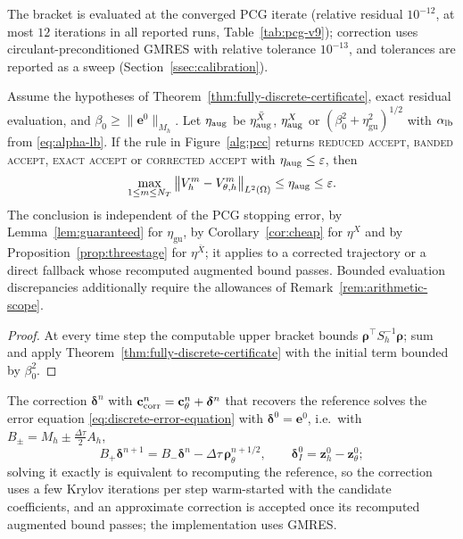 \documentclass[hidelinks]{siamart251216}
\newcommand{\Mh}{M_h}
\newcommand{\Ah}{A_h}
\newcommand{\Sh}{S_h}
\newcommand{\norm}[1]{\left\lVert #1\right\rVert}
\newcommand{\dt}{\Delta\tau}
\newcommand{\etaGuar}{\eta_{\mathrm{gu}}}
\newcommand{\ee}{\mathbf e}
\newcommand{\cc}{\mathbf c}
\newcommand{\rr}{\bm\rho}
\newcommand{\zz}{\mathbf z}
\newcommand{\dd}{\bm\delta}
\begin{document}
The bracket is evaluated at the converged PCG iterate (relative residual $10^{-12}$, at most
$12$ iterations in all reported runs, Table~\ref{tab:pcg-v9}); correction uses circulant-preconditioned
GMRES with relative tolerance $10^{-13}$, and tolerances are reported as a sweep
(Section~\ref{ssec:calibration}).
\begin{proposition}
\label{prop:two-stage}
Assume the hypotheses of Theorem~\ref{thm:fully-discrete-certificate},
exact residual evaluation, and $\beta_0\ge\|\ee^0\|_{\Mh}$. Let $\eta_{\rm aug}$ be
$\eta^{\bar X}_{\rm aug}$, $\eta^X_{\rm aug}$ or $(\beta_0^2+\etaGuar^2)^{1/2}$ with $\alpha_{\rm lb}$ from \eqref{eq:alpha-lb}.
If the rule in Figure~\ref{alg:pcc} returns
\textsc{reduced accept}, \textsc{banded accept}, \textsc{exact accept} or \textsc{corrected accept} with $\eta_{\rm aug}\le\varepsilon$, then
\begin{equation}
  \max_{1\le m\le N_T}\norm{V_h^m-V_{\theta,h}^m}_{L^2(\Omega)}
  \le \eta_{\rm aug}\le\varepsilon .
  \label{eq:soundness}
\end{equation}
The conclusion is independent of the PCG stopping error, by Lemma~\ref{lem:guaranteed} for
$\etaGuar$, by Corollary~\ref{cor:cheap} for $\eta^X$ and by Proposition~\ref{prop:threestage} for $\eta^{\bar X}$;
it applies to a corrected trajectory or a direct fallback whose recomputed augmented bound passes.
Bounded evaluation discrepancies additionally require the allowances of Remark~\ref{rem:arithmetic-scope}.
\end{proposition}
\begin{proof}
At every time step the computable upper bracket bounds $\rr^\top\Sh^{-1}\rr$; sum and apply
Theorem~\ref{thm:fully-discrete-certificate} with the initial term bounded by $\beta_0^2$.
\end{proof}
The correction $\dd^n$ with $\cc^n_{\rm corr}=\cc_\theta^n+\dd^n$ that recovers the reference
solves the error equation \eqref{eq:discrete-error-equation} with $\dd^0=\ee^0$, i.e.\ with
$B_\pm=\Mh\pm\tfrac{\dt}{2}\Ah$,
\begin{equation}
  B_+\dd^{n+1}=B_-\dd^n-\dt\,\rr_\theta^{n+1/2},\qquad \dd^0_I=\zz_h^0-\zz_\theta^0;
  \label{eq:correction-step}
\end{equation}
solving it exactly is equivalent to recomputing the reference, so the correction uses a few
Krylov iterations per step warm-started with the candidate coefficients, and an approximate
correction is accepted once its recomputed augmented bound passes; the implementation uses
GMRES.
\end{document}
